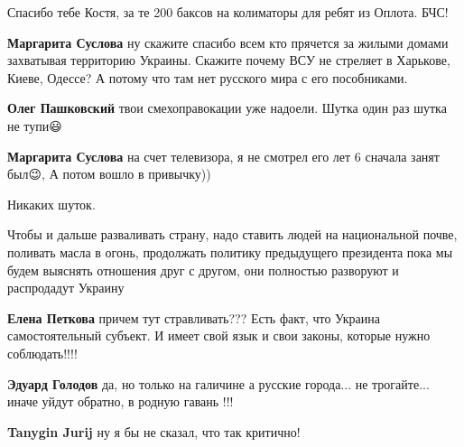 \begin{itemize}
\begin{itemize}
Спасибо тебе Костя, за те 200 баксов на колиматоры для ребят из Оплота. БЧС!

\textbf{Маргарита Суслова} ну скажите спасибо всем кто прячется за жилыми
домами захватывая территорию Украины. Скажите почему ВСУ не стреляет в
Харькове, Киеве, Одессе? А потому что там нет русского мира с его пособниками.

\textbf{Олег Пашковский} твои смехоправокации уже надоели. Шутка один раз шутка не тупи😃

\textbf{Маргарита Суслова} на счет телевизора, я не смотрел его лет 6 сначала занят был😉, А потом вошло в привычку))

Никаких шуток.

\end{itemize}


Чтобы и дальше разваливать страну, надо ставить людей на национальной почве,
поливать масла в огонь, продолжать политику предыдущего президента пока мы
будем выяснять отношения друг с другом, они полностью разворуют и распродадут
Украину

\begin{itemize}
\textbf{Елена Петкова} причем тут стравливать??? Есть факт, что Украина
самостоятельный субъект. И имеет свой язык и свои законы, которые нужно
соблюдать!!!!


\textbf{Эдуард Голодов} да, но только на галичине а русские города... не
трогайте... иначе уйдут обратно, в родную гавань !!!

\textbf{Tanygin Jurij} ну я бы не сказал, что так критично!


\end{itemize}
\end{itemize}
